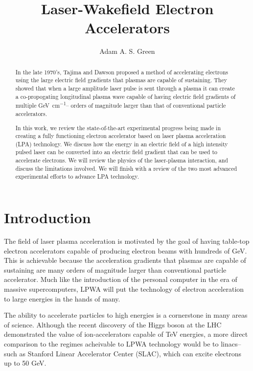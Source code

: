 \documentclass[12pt,letter]{article}
\title{Laser-Wakefield Electron Accelerators}
\author{Adam A. S. Green}
\begin{document}

\maketitle
\doublespacing
\strictpagecheck

\begin{abstract}
In the late 1970's, Tajima and Dawson proposed a method of accelerating 
electrons using the large electric field gradients that plasmas are capable of 
sustaining. They showed that when a large amplitude laser pulse is sent through 
a plasma it can create a co-propogating longitudinal plasma wave 
capable of having electric field gradients of multiple
\si{\giga\electronvolt\per\centi\meter}-- orders
of magnitude larger than that of conventional particle accelerators.

In this work, we review the state-of-the-art experimental progress being made 
in creating a fully functioning electron accelerator based on laser plasma 
acceleration (LPA) technology. We discuss how the energy in an 
 electric field of a high intensity pulsed laser can be converted 
into an electric field gradient that can be used to accelerate electrons. 
We will review the physics of the laser-plasma interaction, and discuss the
limitations involved. We will finish with a review of the two most advanced
experimental efforts to advance LPA technology.  \end{abstract}
\tableofcontents
\section{Introduction}
\label{sec:intro}
The field of laser plasma acceleration is motivated by the goal of having
table-top electron accelerators capable of producing electron beams with
hundreds of \si{\giga\electronvolt}. This is achievable because the acceleration gradients that plasmas are capable of
sustaining are many orders of magnitude larger than conventional particle
accelerator. Much like the introduction of the personal computer in the era of massive
supercomputers, LPWA will put the technology of electron acceleration to
large energies in the hands of many.

 
 
 The ability to accelerate particles to high energies is a cornerstone
 in many areas of science. Although the recent discovery of the Higgs
 boson\cite{atlas} at the LHC demonstrated the value of ion-accelerators capable of
 TeV energies, a more direct comparison to the regimes acheivable to LPWA
 technology would be to linacs-- such as Stanford Linear Accelerator Center
 (SLAC), which can excite electrons up to 50 \si{\giga\electronvolt}.
\end{document}
